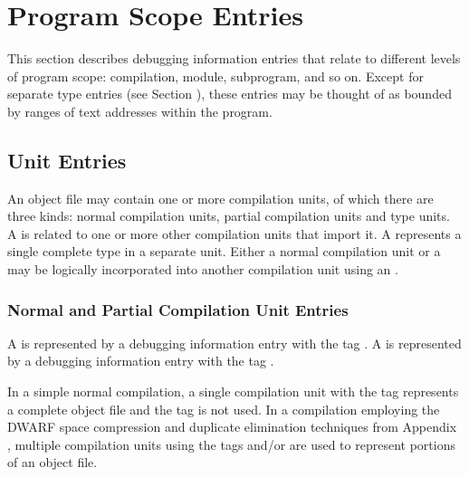 \chapter{Program Scope Entries}
\label{chap:programscopeentries} 
This section describes debugging information entries that
relate to different levels of program scope: compilation,
module, subprogram, and so on. Except for separate type
entries (see Section ), 
these entries may be thought of
as bounded by ranges of text addresses within the program.

\section{Unit Entries}
An object file may contain one or more compilation units,
of which there are
three kinds: 
normal compilation units,
partial compilation units and 
type units. A 
is related to one or more other compilation units that
import it. A 
 represents 
a single complete type in a
separate unit. Either a normal compilation unit or a 
may be logically incorporated into another
compilation unit using an 
.


\subsection[Normal and Partial CU Entries]{Normal and Partial Compilation Unit Entries}
\label{chap:normalandpartialcompilationunitentries}

A  is represented by a debugging
information entry with the 
tag \DWTAGcompileunitTARG. 
A  is represented by a debugging information
entry with the 
tag \DWTAGpartialunitTARG.

In a simple normal compilation, a single compilation unit with
the tag 
\DWTAGcompileunit{} represents a complete object file
and the tag 
\DWTAGpartialunit{} is not used. 
In a compilation
employing the DWARF space compression and duplicate elimination
techniques from 
Appendix , 
multiple compilation units using
the tags 
\DWTAGcompileunit{} and/or 
\DWTAGpartialunit{} are
used to represent portions of an object file.

